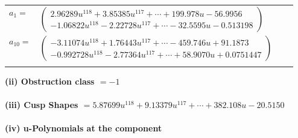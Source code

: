 \documentclass[1p]{elsarticle_modified}
\theoremstyle{definition}
\begin{document}
\begin{tabular}{m{7pt} m{180pt} m{7pt} m{180pt} }
\flushright $a_{1}=$&$\begin{pmatrix}2.96289 u^{118}+3.85385 u^{117}+\cdots+199.978 u-56.9956\\-1.06822 u^{118}-2.22728 u^{117}+\cdots-32.5595 u-0.513198\end{pmatrix}$ \\
\flushright $a_{10}=$&$\begin{pmatrix}-3.11074 u^{118}+1.76443 u^{117}+\cdots-459.746 u+91.1873\\-0.992728 u^{118}-2.77364 u^{117}+\cdots+58.9070 u+0.0751447\end{pmatrix}$\\&\end{tabular}
\flushleft \textbf{(ii) Obstruction class $= -1$}\\~\\
\flushleft \textbf{(iii) Cusp Shapes $= 5.87699 u^{118}+9.13379 u^{117}+\cdots+382.108 u-20.5150$}\\~\\
\newpage\renewcommand{\arraystretch}{1}
\flushleft \textbf{(iv) u-Polynomials at the component}\newline \\
\end{document}
